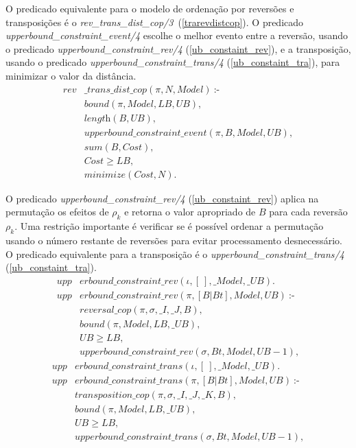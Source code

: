 O predicado equivalente para o modelo de ordenação por reversões e
transposições é
o \textit{rev\_trans\_dist\_cop/3}~(\ref{trarevdistcop}). O
predicado \textit{upperbound\_constraint\_event/4} escolhe o melhor
evento entre a reversão, usando o
predicado \textit{upperbound\_constraint\_rev/4}
(\ref{ub_constaint_rev}), e a transposição, usando o
predicado \textit{upperbound\_constraint\_trans/4}
(\ref{ub_constaint_tra}), para minimizar o valor da distância.
\begin{align}
  \label{trarevdistcop}
  \textit{rev}&\textit{\_trans\_dist\_cop}(\pi, N, Model)~\text{:-} \nonumber\\
  &\textit{bound}(\pi, Model, LB, UB), \nonumber\\
  &\textit{length}(B, UB), \nonumber \\
  &\textit{upperbound\_constraint\_event}(\pi, B, Model, UB), \\
  &\textit{sum}(B, Cost), \nonumber \\
  &\textit{Cost} \ge \textit{LB}, \nonumber \\
  &\textit{minimize}(Cost, N). \nonumber
\end{align}

O predicado \textit{upperbound\_constraint\_rev/4}
(\ref{ub_constaint_rev}) aplica na permutação os efeitos de $\rho_{k}$
e retorna o valor apropriado de $B$ para cada reversão $\rho_{k}$. Uma
restrição importante é verificar se é possível ordenar a permutação
usando o número restante de reversões para evitar processamento
desnecessário. O predicado equivalente para a transposição é o
\textit{upperbound\_constraint\_trans/4} (\ref{ub_constaint_tra}).
\begin{align}
  \label{ub_constaint_rev}
  \textit{upp}&\textit{erbound\_constraint\_rev}(\iota, [~], \_Model, \_UB). \nonumber\\
  \textit{upp}&\textit{erbound\_constraint\_rev}(\pi, [B|Bt], Model, UB)~\text{:-} \nonumber\\
  &\textit{reversal\_cop}(\pi, \sigma, \_I, \_J, B), \\
  &\textit{bound}(\pi, Model, LB, \_UB), \nonumber\\
  &UB \ge LB, \nonumber \\
  &\textit{upperbound\_constraint\_rev}(\sigma, Bt, Model, UB - 1), \nonumber 
\end{align}
\begin{align}
  \label{ub_constaint_tra}
  \textit{upp}&\textit{erbound\_constraint\_trans}(\iota, [~], \_Model, \_UB). \nonumber\\
  \textit{upp}&\textit{erbound\_constraint\_trans}(\pi, [B|Bt], Model, UB)~\text{:-} \nonumber\\
  &\textit{transposition\_cop}(\pi, \sigma, \_I, \_J, \_K, B), \\
  &\textit{bound}(\pi, Model, LB, \_UB), \nonumber\\
  &UB \ge LB, \nonumber \\
  &\textit{upperbound\_constraint\_trans}(\sigma, Bt, Model, UB - 1), \nonumber 
\end{align}


